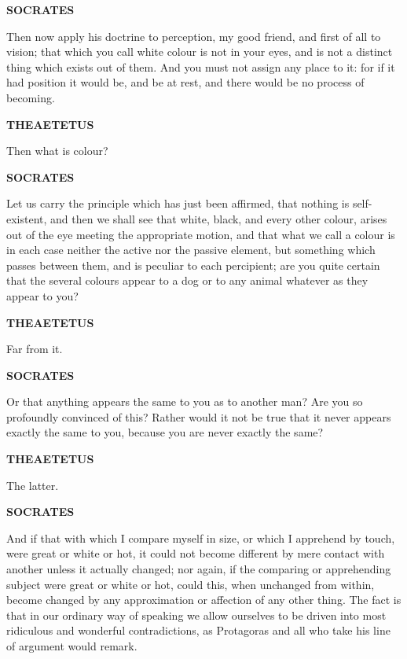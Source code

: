 \documentclass[11pt,letter]{article}
\begin{document}
\par \textbf{SOCRATES}
\par   Then now apply his doctrine to perception, my good friend, and first of all to vision; that which you call white colour is not in your eyes, and is not a distinct thing which exists out of them. And you must not assign any place to it:  for if it had position it would be, and be at rest, and there would be no process of becoming.

\par \textbf{THEAETETUS}
\par   Then what is colour?

\par \textbf{SOCRATES}
\par   Let us carry the principle which has just been affirmed, that nothing is self-existent, and then we shall see that white, black, and every other colour, arises out of the eye meeting the appropriate motion, and that what we call a colour is in each case neither the active nor the passive element, but something which passes between them, and is peculiar to each percipient; are you quite certain that the several colours appear to a dog or to any animal whatever as they appear to you?

\par \textbf{THEAETETUS}
\par   Far from it.

\par \textbf{SOCRATES}
\par   Or that anything appears the same to you as to another man? Are you so profoundly convinced of this? Rather would it not be true that it never appears exactly the same to you, because you are never exactly the same?

\par \textbf{THEAETETUS}
\par   The latter.

\par \textbf{SOCRATES}
\par   And if that with which I compare myself in size, or which I apprehend by touch, were great or white or hot, it could not become different by mere contact with another unless it actually changed; nor again, if the comparing or apprehending subject were great or white or hot, could this, when unchanged from within, become changed by any approximation or affection of any other thing. The fact is that in our ordinary way of speaking we allow ourselves to be driven into most ridiculous and wonderful contradictions, as Protagoras and all who take his line of argument would remark.
\end{document}
